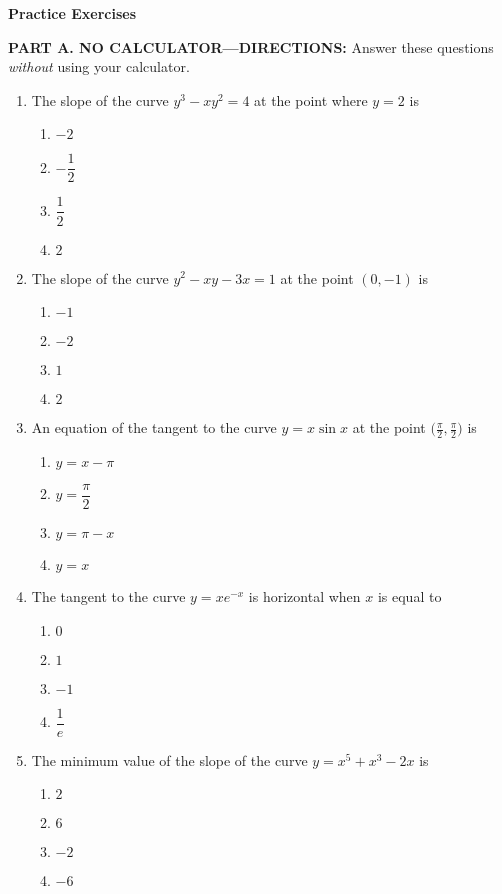 \documentclass[12pt]{article}
\begin{document}
{\LARGE \textbf{Practice Exercises}}

\bigskip
\noindent\textbf{PART A. NO CALCULATOR—DIRECTIONS:} Answer these questions \emph{without} using your calculator.

\begin{enumerate}[label=\textbf{A\arabic*.}]

\item The slope of the curve $y^{3}-xy^{2}=4$ at the point where $y=2$ is
\begin{enumerate}[label=(\Alph*)]
\item $-2$ \item $-\dfrac12$ \item $\dfrac12$ \item $2$
\end{enumerate}

\item The slope of the curve $y^{2}-xy-3x=1$ at the point $(0,-1)$ is
\begin{enumerate}[label=(\Alph*)]
\item $-1$ \item $-2$ \item $1$ \item $2$
\end{enumerate}

\item An equation of the tangent to the curve $y=x\sin x$ at the point $\bigl(\tfrac{\pi}{2},\tfrac{\pi}{2}\bigr)$ is
\begin{enumerate}[label=(\Alph*)]
\item $y=x-\pi$ \item $y=\dfrac{\pi}{2}$ \item $y=\pi-x$ \item $y=x$
\end{enumerate}

\item The tangent to the curve $y=xe^{-x}$ is horizontal when $x$ is equal to
\begin{enumerate}[label=(\Alph*)]
\item $0$ \item $1$ \item $-1$ \item $\dfrac{1}{e}$
\end{enumerate}

\item The minimum value of the slope of the curve $y=x^{5}+x^{3}-2x$ is
\begin{enumerate}[label=(\Alph*)]
\item $2$ \item $6$ \item $-2$ \item $-6$
\end{enumerate}


\end{enumerate}
\end{document}
